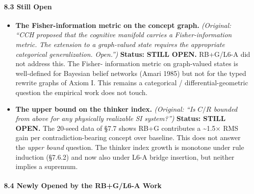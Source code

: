 \documentclass[
  11pt,
  a4paper,
]{article}
\begin{document}
\paragraph{8.3 Still Open}\label{still-open}

\begin{itemize}
\item
  \textbf{The Fisher-information metric on the concept graph.}
  \emph{(Original: ``CCH proposed that the cognitive manifold carries a
  Fisher-information metric. The extension to a graph-valued state
  requires the appropriate categorical generalization. Open.'')}
  \textbf{Status: STILL OPEN.} RB+G/L6-A did not address this. The
  Fisher- information metric on graph-valued states is well-defined for
  Bayesian belief networks (Amari 1985) but not for the typed rewrite
  graphs of Axiom I. This remains a categorical / differential-geometric
  question the empirical work does not touch.
\item
  \textbf{The upper bound on the thinker index.} \emph{(Original: ``Is
  \(C/R\) bounded from above for any physically realizable SI
  system?'')} \textbf{Status: STILL OPEN.} The 20-seed data of §7.7
  shows RB+G contributes a \textasciitilde1.5× RMS gain per
  contradiction-bearing concept over baseline. This does not answer the
  \emph{upper bound} question. The thinker index growth is monotone
  under rule induction (§7.6.2) and now also under L6-A bridge
  insertion, but neither implies a supremum.
\end{itemize}

\paragraph{8.4 Newly Opened by the RB+G/L6-A
Work}\label{newly-opened-by-the-rbgl6-a-work}
\end{document}
